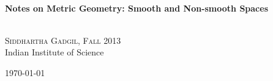 \begin{titlepage}
\begin{center}

\HRule \\[0.4cm]
{ \Large \bfseries Notes on Metric Geometry: Smooth and Non-smooth Spaces\\[0.4cm] }

\HRule \\[1.5cm]

\textsc{\Large Siddhartha Gadgil, Fall 2013}\\[0.5cm]

{\Large Indian Institute of Science}\\[0.5cm]

\vfill

{\large \today}

\end{center}
\end{titlepage}